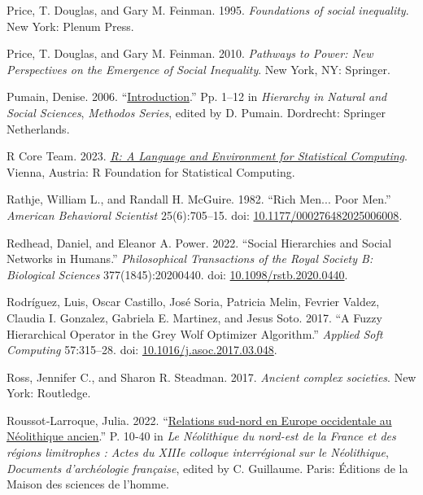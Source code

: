 \documentclass[
  12pt,
]{book}
\newlength{\cslhangindent}
\newlength{\cslentryspacingunit} %
\newenvironment{CSLReferences}[2] %
 {%
  \setlength{\parindent}{0pt}
  \ifodd #1
  \let\oldpar\par
  \def\par{\hangindent=\cslhangindent\oldpar}
  \fi
  \setlength{\parskip}{#2\cslentryspacingunit}
 }%
 {}
\begin{document}
\begin{CSLReferences}{1}{0}
\leavevmode{}%
Price, T. Douglas, and Gary M. Feinman. 1995. \emph{Foundations of social inequality}. New York: Plenum Press.

\leavevmode{}%
Price, T. Douglas, and Gary M. Feinman. 2010. \emph{Pathways to Power: New Perspectives on the Emergence of Social Inequality}. New York, NY: Springer.

\leavevmode{}%
Pumain, Denise. 2006. {``\href{https://doi.org/10.1007/1-4020-4127-6_1}{Introduction}.''} Pp. 1--12 in \emph{Hierarchy in {Natural} and {Social Sciences}}, \emph{Methodos {Series}}, edited by D. Pumain. {Dordrecht}: {Springer Netherlands}.

\leavevmode{}%
R Core Team. 2023. \emph{\href{https://www.R-project.org/}{R: A Language and Environment for Statistical Computing}}. Vienna, Austria: R Foundation for Statistical Computing.

\leavevmode{}%
Rathje, William L., and Randall H. McGuire. 1982. {``Rich Men... Poor Men.''} \emph{American Behavioral Scientist} 25(6):705--15. doi: \href{https://doi.org/10.1177/000276482025006008}{10.1177/000276482025006008}.

\leavevmode{}%
Redhead, Daniel, and Eleanor A. Power. 2022. {``Social Hierarchies and Social Networks in Humans.''} \emph{Philosophical Transactions of the Royal Society B: Biological Sciences} 377(1845):20200440. doi: \href{https://doi.org/10.1098/rstb.2020.0440}{10.1098/rstb.2020.0440}.

\leavevmode{}%
Rodríguez, Luis, Oscar Castillo, José Soria, Patricia Melin, Fevrier Valdez, Claudia I. Gonzalez, Gabriela E. Martinez, and Jesus Soto. 2017. {``A Fuzzy Hierarchical Operator in the Grey Wolf Optimizer Algorithm.''} \emph{Applied Soft Computing} 57:315--28. doi: \href{https://doi.org/10.1016/j.asoc.2017.03.048}{10.1016/j.asoc.2017.03.048}.

\leavevmode{}%
Ross, Jennifer C., and Sharon R. Steadman. 2017. \emph{Ancient complex societies}. New York: Routledge.

\leavevmode{}%
Roussot‑Larroque, Julia. 2022. {``\href{https://doi.org/10.4000/books.editionsmsh.39018}{Relations sud‑nord en Europe occidentale au Néolithique ancien}.''} P. 10‑40 in \emph{Le Néolithique du nord-est de la France et des régions limitrophes : Actes du XIIIe colloque interrégional sur le Néolithique}, \emph{Documents d'archéologie française}, edited by C. Guillaume. {Paris}: {Éditions de la Maison des sciences de l'homme}.


\end{CSLReferences}
\end{document}
